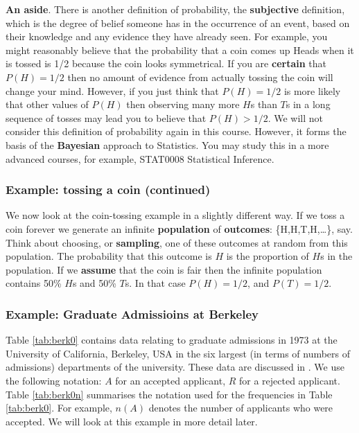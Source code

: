 \documentclass[
  11pt,
  british,
  openany, a4paper]{book}
\begin{document}
\textbf{An aside}. There is another definition of probability, the \textbf{subjective} definition, which is the degree of belief someone has in the occurrence of an event, based on their knowledge and any evidence they have already seen. For example, you might reasonably believe that the probability that a coin comes up Heads when it is tossed is 1/2 because the coin looks symmetrical. If you are \textbf{certain} that \(P(H)=1/2\) then no amount of evidence from actually tossing the coin will change your mind. However, if you just think that \(P(H)=1/2\) is more likely that other values of \(P(H)\) then observing many more \(H\)s than \(T\)s in a long sequence of tosses may lead you to believe that \(P(H)>1/2\). We will not consider this definition of probability again in this course. However, it forms the basis of the \textbf{Bayesian} approach to Statistics. You may study this in a more advanced courses, for example, STAT0008 Statistical Inference.

\hypertarget{example-tossing-a-coin-continued}{%
\subsubsection*{Example: tossing a coin (continued)}\label{example-tossing-a-coin-continued}}

We now look at the coin-tossing example in a slightly different way. If we toss a coin forever we generate an infinite \textbf{population} of \textbf{outcomes}: \{H,H,T,H,\ldots \}, say. Think about choosing, or \textbf{sampling}, one of these outcomes at random from this population. The probability that this outcome is \(H\) is the proportion of \(H\)s in the population. If we \textbf{assume} that the coin is fair then the infinite population contains 50\% \(H\)s and 50\% \(T\)s. In that case \(P(H)=1/2\), and \(P(T)=1/2\).

\hypertarget{example-graduate-admissioins-at-berkeley}{%
\subsubsection*{Example: Graduate Admissioins at Berkeley}\label{example-graduate-admissioins-at-berkeley}}

Table \ref{tab:berk0} contains data relating to graduate admissions in 1973 at the University of California, Berkeley, USA in the six largest (in terms of numbers of admissions) departments of the university. These data are discussed in \citet{berkeley}. We use the following notation: \(A\) for an accepted applicant, \(R\) for a rejected applicant. Table \ref{tab:berk0n} summarises the notation used for the frequencies in Table \ref{tab:berk0}. For example, \(n(A)\) denotes the number of applicants who were accepted. We will look at this example in more detail later.
\end{document}
